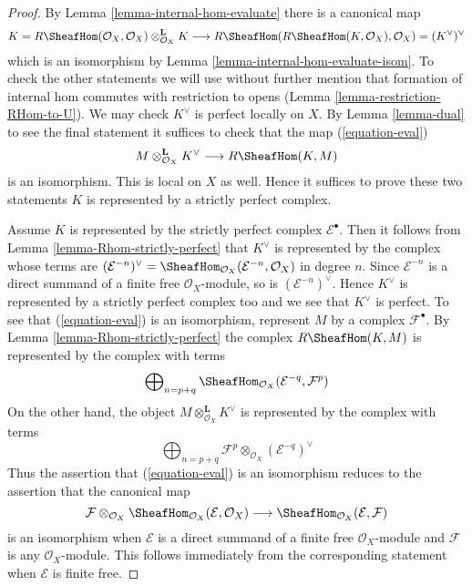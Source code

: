 \begin{proof}
By Lemma \ref{lemma-internal-hom-evaluate} there is a canonical map
$$
K = R\SheafHom(\mathcal{O}_X, \mathcal{O}_X)
\otimes_{\mathcal{O}_X}^\mathbf{L} K \longrightarrow
R\SheafHom(R\SheafHom(K, \mathcal{O}_X), \mathcal{O}_X) =
(K^\vee)^\vee
$$
which is an isomorphism by Lemma \ref{lemma-internal-hom-evaluate-isom}.
To check the other statements we will use without further mention that
formation of internal hom commutes with restriction to opens
(Lemma \ref{lemma-restriction-RHom-to-U}).
We may check $K^\vee$ is perfect locally on $X$.
By Lemma \ref{lemma-dual}
to see the final statement it suffices to check that the map
(\ref{equation-eval})
$$
M \otimes^\mathbf{L}_{\mathcal{O}_X} K^\vee
\longrightarrow
R\SheafHom(K, M)
$$
is an isomorphism. This is local on $X$ as well.
Hence it suffices to prove these two statements $K$ is represented
by a strictly perfect complex.

\medskip\noindent
Assume $K$ is represented by the strictly perfect complex
$\mathcal{E}^\bullet$. Then it follows from
Lemma \ref{lemma-Rhom-strictly-perfect}
that $K^\vee$ is represented by the complex whose terms are
$(\mathcal{E}^{-n})^\vee =
\SheafHom_{\mathcal{O}_X}(\mathcal{E}^{-n}, \mathcal{O}_X)$
in degree $n$. Since $\mathcal{E}^{-n}$ is a direct summand of a finite
free $\mathcal{O}_X$-module, so is $(\mathcal{E}^{-n})^\vee$.
Hence $K^\vee$ is represented by a strictly perfect complex too
and we see that $K^\vee$ is perfect.
To see that (\ref{equation-eval}) is an isomorphism, represent
$M$ by a complex $\mathcal{F}^\bullet$.
By Lemma \ref{lemma-Rhom-strictly-perfect} the complex
$R\SheafHom(K, M)$ is represented by the complex with terms
$$
\bigoplus\nolimits_{n = p + q}
\SheafHom_{\mathcal{O}_X}(\mathcal{E}^{-q}, \mathcal{F}^p)
$$
On the other hand, the object $M \otimes^\mathbf{L}_{\mathcal{O}_X} K^\vee$
is represented by the complex with terms
$$
\bigoplus\nolimits_{n = p + q}
\mathcal{F}^p \otimes_{\mathcal{O}_X} (\mathcal{E}^{-q})^\vee
$$
Thus the assertion that (\ref{equation-eval}) is an isomorphism
reduces to the assertion that the canonical map
$$
\mathcal{F}
\otimes_{\mathcal{O}_X}
\SheafHom_{\mathcal{O}_X}(\mathcal{E}, \mathcal{O}_X)
\longrightarrow
\SheafHom_{\mathcal{O}_X}(\mathcal{E}, \mathcal{F})
$$
is an isomorphism when $\mathcal{E}$ is a direct summand of a finite
free $\mathcal{O}_X$-module and $\mathcal{F}$ is any $\mathcal{O}_X$-module.
This follows immediately from the corresponding statement when
$\mathcal{E}$ is finite free.
\end{proof}

